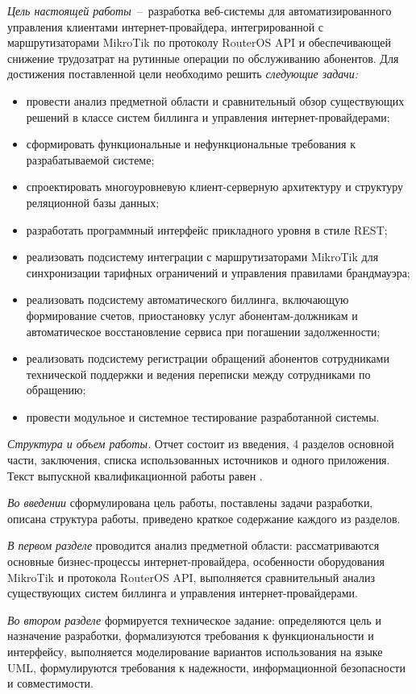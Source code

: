 \emph{Цель настоящей работы}~--~разработка веб-системы для автоматизированного управления клиентами интернет-провайдера, интегрированной с маршрутизаторами MikroTik по протоколу RouterOS API и обеспечивающей снижение трудозатрат на рутинные операции по обслуживанию абонентов. Для достижения поставленной цели необходимо решить \emph{следующие задачи:}
\begin{itemize}
\item провести анализ предметной области и сравнительный обзор существующих решений в классе систем биллинга и управления интернет-провайдерами;
\item сформировать функциональные и нефункциональные требования к разрабатываемой системе;
\item спроектировать многоуровневую клиент-серверную архитектуру и структуру реляционной базы данных;
\item разработать программный интерфейс прикладного уровня в стиле REST;
\item реализовать подсистему интеграции с маршрутизаторами MikroTik для синхронизации тарифных ограничений и управления правилами брандмауэра;
\item реализовать подсистему автоматического биллинга, включающую формирование счетов, приостановку услуг абонентам-должникам и автоматическое восстановление сервиса при погашении задолженности;
\item реализовать подсистему регистрации обращений абонентов сотрудниками технической поддержки и ведения переписки между сотрудниками по обращению;
\item провести модульное и системное тестирование разработанной системы.
\end{itemize}

\emph{Структура и объем работы.} Отчет состоит из введения, 4 разделов основной части, заключения, списка использованных источников и одного приложения. Текст выпускной квалификационной работы равен .

\emph{Во введении} сформулирована цель работы, поставлены задачи разработки, описана структура работы, приведено краткое содержание каждого из разделов.

\emph{В первом разделе} проводится анализ предметной области: рассматриваются основные бизнес-процессы интернет-провайдера, особенности оборудования MikroTik и протокола RouterOS API, выполняется сравнительный анализ существующих систем биллинга и управления интернет-провайдерами.

\emph{Во втором разделе} формируется техническое задание: определяются цель и назначение разработки, формализуются требования к функциональности и интерфейсу, выполняется моделирование вариантов использования на языке UML, формулируются требования к надежности, информационной безопасности и совместимости.

